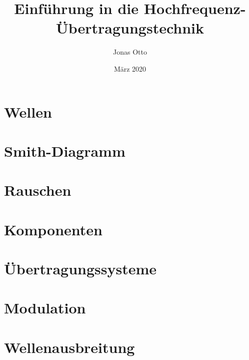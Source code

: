 \documentclass{report}
\title{Einführung in die Hochfrequenz-Übertragungstechnik}
\author{Jonas Otto}
\date{März 2020}
\begin{document}
\tableofcontents
\maketitle

\chapter{Wellen}



\chapter{Smith-Diagramm}



\chapter{Rauschen}

\chapter{Komponenten}

\chapter{Übertragungssysteme}

\chapter{Modulation}

\chapter{Wellenausbreitung}
\end{document}
